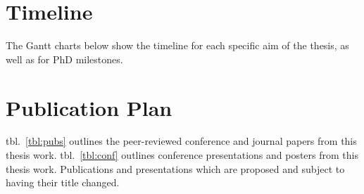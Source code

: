 \documentclass[defaultstyle,11pt]{comps}
\begin{document}
\hypertarget{timeline}{%
\section{Timeline}\label{timeline}}

The Gantt charts below show the timeline for each specific aim of the thesis, as well as for PhD milestones.

\hypertarget{publication-plan}{%
\section{Publication Plan}\label{publication-plan}}

tbl.~\ref{tbl:pubs} outlines the peer-reviewed conference and journal papers from this thesis work.
tbl.~\ref{tbl:conf} outlines conference presentations and posters from this thesis work.
Publications and presentations which are proposed and subject to having their title changed.
\end{document}
